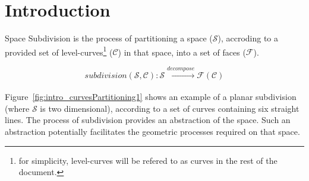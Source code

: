 \section{Introduction}
Space Subdivision is the process of partitioning a space ($\mathcal{S}$), accroding to a provided set of level-curves\footnote{for simplicity, level-curves will be refered to as curves in the rest of the document.} ($\mathcal{C}$) in that space, into a set of faces ($\mathcal{F}$). 

\[ \mathit{subdivision}(\mathcal{S}, \mathcal{C}): \mathcal{S} \xrightarrow[]{decompose} \mathcal{F}\left(\mathcal{C}\right) \]

Figure~\ref{fig:intro_curvesPartitioning1} shows an example of a planar subdivision (where $\mathcal{S}$ is two dimensional), according to a set of curves containing six straight lines.
The process of subdivision provides an abstraction of the space.
Such an abstraction potentially facilitates the geometric processes required on that space.


